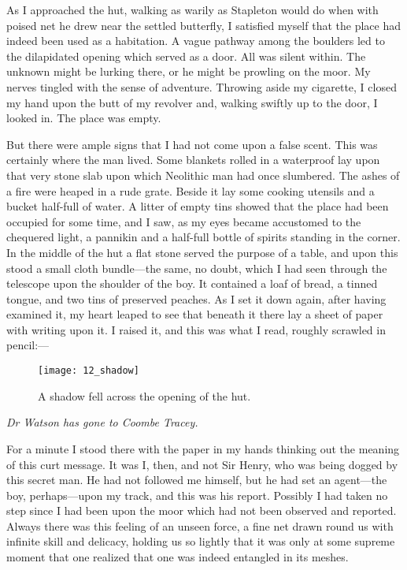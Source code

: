 As I approached the hut, walking as warily as Stapleton would do when with poised net he drew near the settled butterfly, I satisfied myself that the place had indeed been used as a habitation. A vague pathway among the boulders led to the dilapidated opening which served as a door. All was silent within. The unknown might be lurking there, or he might be prowling on the moor. My nerves tingled with the sense of adventure. Throwing aside my cigarette, I closed my hand upon the butt of my revolver and, walking swiftly up to the door, I looked in. The place was empty.

But there were ample signs that I had not come upon a false scent. This was certainly where the man lived. Some blankets rolled in a waterproof lay upon that very stone slab upon which Neolithic man had once slumbered. The ashes of a fire were heaped in a rude grate. Beside it lay some cooking utensils and a bucket half-full of water. A litter of empty tins showed that the place had been occupied for some time, and I saw, as my eyes became accustomed to the chequered light, a pannikin and a half-full bottle of spirits standing in the corner. In the middle of the hut a flat stone served the purpose of a table, and upon this stood a small cloth bundle\allowbreak---\allowbreak the same, no doubt, which I had seen through the telescope upon the shoulder of the boy. It contained a loaf of bread, a tinned tongue, and two tins of preserved peaches. As I set it down again, after having examined it, my heart leaped to see that beneath it there lay a sheet of paper with writing upon it. I raised it, and this was what I read, roughly scrawled in pencil:\allowbreak---\allowbreak  

\begin{figure}[p]
\centering
\texttt{[image: 12\_shadow]}
\caption{A shadow fell across the opening of the hut.}
\end{figure}

\textit{Dr Watson has gone to Coombe Tracey.}

For a minute I stood there with the paper in my hands thinking out the meaning of this curt message. It was I, then, and not Sir Henry, who was being dogged by this secret man. He had not followed me himself, but he had set an agent\allowbreak---\allowbreak the boy, perhaps\allowbreak---\allowbreak upon my track, and this was his report. Possibly I had taken no step since I had been upon the moor which had not been observed and reported. Always there was this feeling of an unseen force, a fine net drawn round us with infinite skill and delicacy, holding us so lightly that it was only at some supreme moment that one realized that one was indeed entangled in its meshes.


